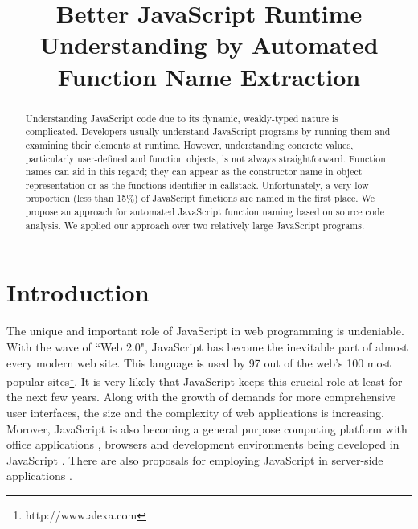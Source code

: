 \documentclass[conference]{IEEEtran}
\begin{document}
%
\title{Better JavaScript Runtime Understanding by Automated Function Name Extraction}


\author{
\and
{}
\and
{}
}
\maketitle


\begin{abstract}
Understanding JavaScript code due to its dynamic, weakly-typed nature is complicated. Developers usually understand JavaScript programs by running them and examining their elements at runtime. However, understanding concrete values, particularly user-defined and function objects, is not always straightforward. Function names can aid in this regard; they can appear as the constructor name in object representation or as the functions identifier in callstack. Unfortunately, a very low proportion (less than 15\%) of JavaScript functions are named in the first place. We propose an approach for automated JavaScript function naming based on source code analysis. We applied our approach over two relatively large JavaScript programs.
\end{abstract}

\section{Introduction}
The unique and important role of JavaScript in web programming is undeniable. With the wave of ``Web 2.0", JavaScript has become the inevitable part of almost every modern web site. This language is used by 97 out of the web's 100 most popular sites\footnote[1]{http://www.alexa.com}. It is very likely that JavaScript keeps this crucial role at least for the next few years. Along with the growth of demands for more comprehensive user interfaces, the size and the complexity of web applications is increasing. Morover, JavaScript is also becoming a general purpose computing platform with office applications \cite{JSOffice, JSOffice2}, browsers \cite{FAO, GCE} and development environments \cite{Ingalls} being developed in JavaScript \cite{Richards}. There are also proposals for employing JavaScript in server-side applications \cite{SSJSR, CJS}.
\end{document}
